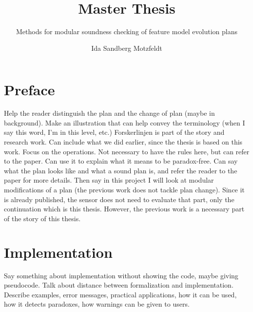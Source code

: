 \documentclass[a4paper,english]{ifimaster}
\title{Master Thesis}
\subtitle{Methods for modular soundness checking of feature model evolution plans}
\author{Ida Sandberg Motzfeldt}
\begin{document}
\duoforside[dept={Department of Informatics},
program={Informatics: Programming and System Architecture},
            option={Software},
long]

\frontmatter{}


\tableofcontents{}
\listoffigures{}
\listoftables{}

\chapter*{Preface}

\mainmatter{}





Help the reader distinguish the plan and the change of plan (maybe in background). Make an illustration that can help convey the terminology (when I say this word, I'm in this level, etc.)
Forskerlinjen is part of the story and research work. Can include what we did earlier, since the thesis is based on this work. Focus on the operations. Not necessary to have the rules here, but can refer to the paper. Can use it to explain what it means to be paradox-free. Can say what the plan looks like and what a sound plan is, and refer the reader to the paper for more details. Then say in this project I will look at modular modifications of a plan (the previous work does not tackle plan change). Since it is already published, the sensor does not need to evaluate that part, only the continuation which is this thesis. However, the previous work is a necessary part of the story of this thesis.


 



\chapter{Implementation}  

Say something about implementation without showing the code, maybe giving pseudocode. Talk about distance between formalization and implementation. Describe examples, error messages, practical applications, how it can be used, how it detects paradoxes, how warnings can be given to users.
\end{document}
